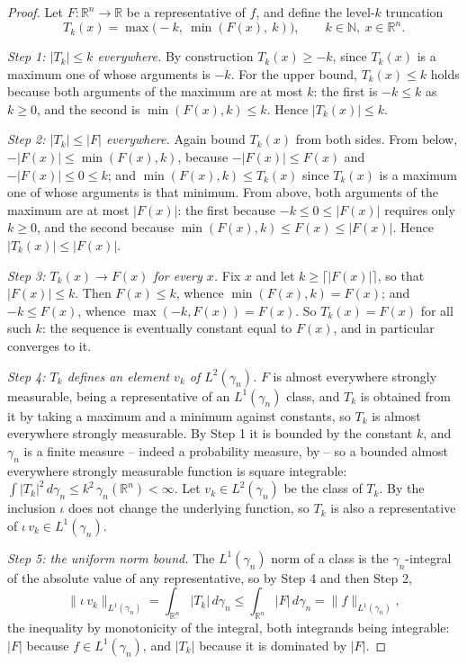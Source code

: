 \begin{proof}
Let $F : \mathbb{R}^n \to \mathbb{R}$ be a representative of $f$, and define the
level-$k$ truncation
\[
  T_k(x) = \max\bigl(-k,\ \min(F(x),\ k)\bigr),
  \qquad k \in \mathbb{N},\ x \in \mathbb{R}^n .
\]

\emph{Step 1: $|T_k| \leq k$ everywhere.}
By construction $T_k(x) \geq -k$, since $T_k(x)$ is a maximum one of whose
arguments is $-k$.  For the upper bound, $T_k(x) \leq k$ holds because both
arguments of the maximum are at most $k$: the first is $-k \leq k$ as $k \geq 0$,
and the second is $\min(F(x),k) \leq k$.  Hence $|T_k(x)| \leq k$.

\emph{Step 2: $|T_k| \leq |F|$ everywhere.}
Again bound $T_k(x)$ from both sides.  From below,
$-|F(x)| \leq \min(F(x), k)$, because $-|F(x)| \leq F(x)$ and
$-|F(x)| \leq 0 \leq k$; and $\min(F(x),k) \leq T_k(x)$ since $T_k(x)$ is a
maximum one of whose arguments is that minimum.  From above, both arguments of the
maximum are at most $|F(x)|$: the first because $-k \leq 0 \leq |F(x)|$ requires
only $k \geq 0$, and the second because
$\min(F(x),k) \leq F(x) \leq |F(x)|$.  Hence $|T_k(x)| \leq |F(x)|$.

\emph{Step 3: $T_k(x) \to F(x)$ for every $x$.}
Fix $x$ and let $k \geq \lceil |F(x)| \rceil$, so that $|F(x)| \leq k$.  Then
$F(x) \leq k$, whence $\min(F(x),k) = F(x)$; and $-k \leq F(x)$, whence
$\max(-k, F(x)) = F(x)$.  So $T_k(x) = F(x)$ for all such $k$: the sequence is
eventually constant equal to $F(x)$, and in particular converges to it.

\emph{Step 4: $T_k$ defines an element $v_k$ of $L^2(\gamma_n)$.}
$F$ is almost everywhere strongly measurable, being a representative of an
$L^1(\gamma_n)$ class, and $T_k$ is obtained from it by taking a maximum and a
minimum against constants, so $T_k$ is almost everywhere strongly measurable.  By
Step 1 it is bounded by the constant $k$, and $\gamma_n$ is a finite measure --
indeed a probability measure, by  -- so a bounded almost
everywhere strongly measurable function is square integrable:
$\int |T_k|^2 \, d\gamma_n \leq k^2\,\gamma_n(\mathbb{R}^n) < \infty$.  Let
$v_k \in L^2(\gamma_n)$ be the class of $T_k$.  By  the inclusion
$\iota$ does not change the underlying function, so $T_k$ is also a representative
of $\iota\, v_k \in L^1(\gamma_n)$.

\emph{Step 5: the uniform norm bound.}
The $L^1(\gamma_n)$ norm of a class is the $\gamma_n$-integral of the absolute
value of any representative, so by Step 4 and then Step 2,
\[
  \|\iota\, v_k\|_{L^1(\gamma_n)}
    = \int_{\mathbb{R}^n} |T_k| \, d\gamma_n
    \leq \int_{\mathbb{R}^n} |F| \, d\gamma_n
    = \|f\|_{L^1(\gamma_n)} ,
\]
the inequality by monotonicity of the integral, both integrands being integrable:
$|F|$ because $f \in L^1(\gamma_n)$, and $|T_k|$ because it is dominated by $|F|$.


\end{proof}
